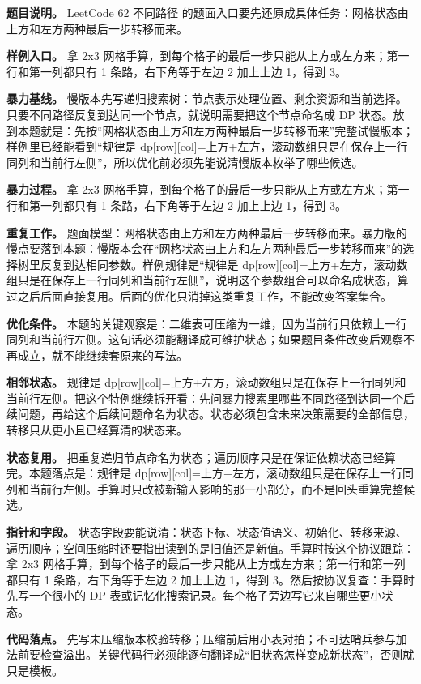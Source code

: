 \textbf{题目说明。} LeetCode 62 不同路径 的题面入口要先还原成具体任务：网格状态由上方和左方两种最后一步转移而来。

\textbf{样例入口。} 拿 2x3 网格手算，到每个格子的最后一步只能从上方或左方来；第一行和第一列都只有 1 条路，右下角等于左边 2 加上上边 1，得到 3。

\textbf{暴力基线。} 慢版本先写递归搜索树：节点表示处理位置、剩余资源和当前选择。只要不同路径反复到达同一个节点，就说明需要把这个节点命名成 DP 状态。放到本题就是：先按“网格状态由上方和左方两种最后一步转移而来”完整试慢版本；样例里已经能看到“规律是 dp[row][col]=上方+左方，滚动数组只是在保存上一行同列和当前行左侧”，所以优化前必须先能说清慢版本枚举了哪些候选。

\textbf{暴力过程。} 拿 2x3 网格手算，到每个格子的最后一步只能从上方或左方来；第一行和第一列都只有 1 条路，右下角等于左边 2 加上上边 1，得到 3。

\textbf{重复工作。} 题面模型：网格状态由上方和左方两种最后一步转移而来。暴力版的慢点要落到本题：慢版本会在“网格状态由上方和左方两种最后一步转移而来”的选择树里反复到达相同参数。样例规律是“规律是 dp[row][col]=上方+左方，滚动数组只是在保存上一行同列和当前行左侧”，说明这个参数组合可以命名成状态，算过之后后面直接复用。后面的优化只消掉这类重复工作，不能改变答案集合。

\textbf{优化条件。} 本题的关键观察是：二维表可压缩为一维，因为当前行只依赖上一行同列和当前行左侧。这句话必须能翻译成可维护状态；如果题目条件改变后观察不再成立，就不能继续套原来的写法。

\textbf{相邻状态。} 规律是 dp[row][col]=上方+左方，滚动数组只是在保存上一行同列和当前行左侧。把这个特例继续拆开看：先问暴力搜索里哪些不同路径到达同一个后续问题，再给这个后续问题命名为状态。状态必须包含未来决策需要的全部信息，转移只从更小且已经算清的状态来。

\textbf{状态复用。} 把重复递归节点命名为状态；遍历顺序只是在保证依赖状态已经算完。本题落点是：规律是 dp[row][col]=上方+左方，滚动数组只是在保存上一行同列和当前行左侧。手算时只改被新输入影响的那一小部分，而不是回头重算完整候选。

\textbf{指针和字段。} 状态字段要能说清：状态下标、状态值语义、初始化、转移来源、遍历顺序；空间压缩时还要指出读到的是旧值还是新值。手算时按这个协议跟踪：拿 2x3 网格手算，到每个格子的最后一步只能从上方或左方来；第一行和第一列都只有 1 条路，右下角等于左边 2 加上上边 1，得到 3。然后按协议复查：手算时先写一个很小的 DP 表或记忆化搜索记录。每个格子旁边写它来自哪些更小状态。

\textbf{代码落点。} 先写未压缩版本校验转移；压缩前后用小表对拍；不可达哨兵参与加法前要检查溢出。关键代码行必须能逐句翻译成“旧状态怎样变成新状态”，否则就只是模板。

